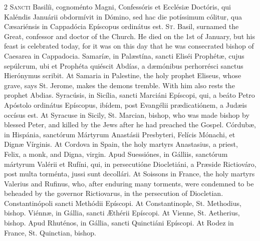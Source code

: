 \begin{paracol}{2}
\lettrine[lines=2]{S}{ancti} Basilíi, 
 cognoménto Magni, Confessóris et Ecclésiæ Doctóris, qui Kaléndis Januárii 
 obdormívit in Dómino, sed hac die potíssimum cólitur, qua Cæsariénsis in 
 Cappadócia Epíscopus ordinátus est.
\switchcolumn
{}
\lettrine[lines=2]{S}{t.} Basil, surnamed the Great, 
 confessor and doctor of the Church. He died on the 1st of January, but 
 his feast is celebrated today, for it was on this day that he was 
 consecrated bishop of Caesarea in Cappadocia.
\switchcolumn*
{}
Samaríæ, in Palæstína, 
 sancti Eliséi Prophétæ, cujus sepúlcrum, ubi et Prophéta quiéscit Abdías, a 
 dæmónibus perhorrésci sanctus Hierónymus scribit.
\switchcolumn
{}
At Samaria in Palestine, the holy 
 prophet Eliseus, whose grave, says St. Jerome, makes the demons tremble. 
 With him also rests the prophet Abdias.
\switchcolumn*
{}
Syracúsis, in Sicília, 
 sancti Marciáni Epíscopi, qui, a beáto Petro Apóstolo ordinátus Epíscopus, 
 ibídem, post Evangélii prædicatiónem, a Judæis occísus est.
\switchcolumn
{}
At Syracuse in Sicily, St. Marcian, 
 bishop, who was made bishop by blessed Peter, and killed by the Jews after 
 he had preached the Gospel.
\switchcolumn*
{}
Córdubæ, in Hispánia, 
 sanctórum Mártyrum Anastásii Presbyteri, Felícis Mónachi, et Dignæ Vírginis.
\switchcolumn
{}
At Cordova in Spain, the holy 
 martyrs Anastasius, a priest, Felix, a monk, and Digna, virgin.
\switchcolumn*
{}
Apud Suessiónes, in 
 Gálliis, sanctórum mártyrum Valérii et Rufíni, qui, in persecutióne 
 Diocletiáni, a Præside Rictiováro, post multa torménta, jussi sunt decollári.
\switchcolumn
{}
At Soissons in France, the holy 
 martyrs Valerius and Rufinus, who, after enduring many torments, were 
 condemned to be beheaded by the governor Rictiovarus, in the persecution of 
 Diocletian.
\switchcolumn*
{}
Constantinópoli sancti 
 Methódii Epíscopi.
\switchcolumn
{}
At Constantinople, St. Methodius, 
 bishop.
\switchcolumn*
{}
Viénnæ, in Gállia, 
 sancti Æthérii Epíscopi.
\switchcolumn
{}
At Vienne, St. Aetherius, bishop.
\switchcolumn*
{}
Apud Rhuténos, in 
 Gállia, sancti Quinctiáni Epíscopi.
\switchcolumn
{}
At Rodez in France, St. Quinctian, 
 bishop.
\switchcolumn*
{}
\end{paracol}


